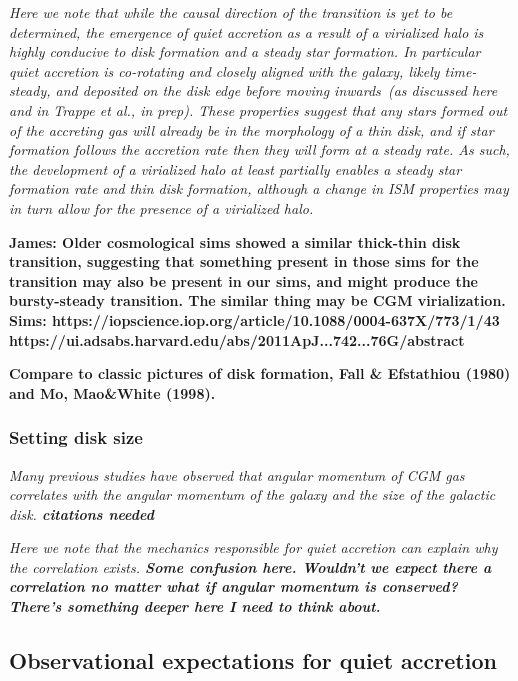 \documentclass[fleqn,usenatbib]{mnras}
\begin{document}
\textit{
Here we note that while the causal direction of the transition is yet to be determined, the emergence of quiet accretion as a result of a virialized halo is highly conducive to disk formation and a steady star formation.
In particular quiet accretion is co-rotating and closely aligned with the galaxy, likely time-steady, and deposited on the disk edge before moving inwards~(as discussed here and in Trappe et al., in prep).
These properties suggest that any stars formed out of the accreting gas will already be in the morphology of a thin disk, and if star formation follows the accretion rate then they will form at a steady rate.
As such, the development of a virialized halo at least partially enables a steady star formation rate and thin disk formation, although a change in ISM properties may in turn allow for the presence of a virialized halo.
}

\textbf{
James: Older cosmological sims showed a similar thick-thin disk transition, suggesting that something present in those sims for the transition may also be present in our sims, and might produce the bursty-steady transition.
The similar thing may be CGM virialization.
Sims: 
https://iopscience.iop.org/article/10.1088/0004-637X/773/1/43
https://ui.adsabs.harvard.edu/abs/2011ApJ...742...76G/abstract
}

\textbf{
Compare to classic pictures of disk formation, Fall \& Efstathiou (1980) and Mo, Mao\&White (1998).
}

\subsubsection{Setting disk size}

\textit{
Many previous studies have observed that angular momentum of CGM gas correlates with the angular momentum of the galaxy and the size of the galactic disk.
\textbf{citations needed}
}

\textit{
Here we note that the mechanics responsible for quiet accretion can explain why the correlation exists.
\textbf{Some confusion here. Wouldn't we expect there a correlation no matter what if angular momentum is conserved? There's something deeper here I need to think about.}
}

\subsection{Observational expectations for quiet accretion}
\label{s: observational expectations}
\end{document}
